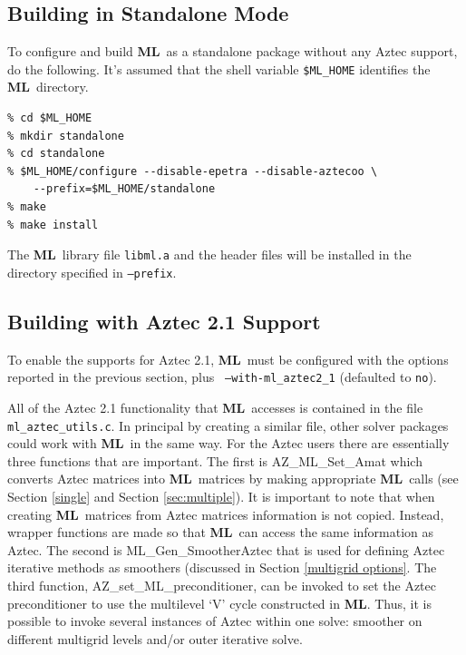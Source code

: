 \documentclass{article}[11pt]
\newcommand{\ML}     {{\bf ML}}
\begin{document}
\subsection{Building in Standalone Mode}
\label{Standalone Mode}
%

To configure and build \ML\ as a standalone package without any {\sc Aztec}
support, do the following.  It's assumed that the shell variable
\verb!$ML_HOME! identifies
the \ML\ directory.\\
\begin{verbatim}
% cd $ML_HOME
% mkdir standalone
% cd standalone
% $ML_HOME/configure --disable-epetra --disable-aztecoo \
    --prefix=$ML_HOME/standalone
% make
% make install
\end{verbatim}
The \ML\ library file {\tt libml.a} and the header files will be
installed in the directory specified in {\tt --prefix}.


\subsection{Building with {\sc Aztec 2.1} Support} 
\label{other packages}

To enable the supports for {\sc Aztec 2.1}, \ML\ must be configured with
the options reported in the previous section, plus {\tt
  --with-ml\_aztec2\_1} (defaulted to {\tt no}).

All of the {\sc Aztec 2.1} functionality that \ML\ accesses is contained
in the file \verb'ml_aztec_utils.c'. In principal by creating a similar
file, other solver packages could work with \ML\ in the same way.  For
the {\sc Aztec} users there are essentially three functions that are
important.  The first is {\sf AZ\_ML\_Set\_Amat} which converts {\sc
  Aztec} matrices into \ML\ matrices by making appropriate \ML\ calls (see
Section \ref{single} and Section \ref{sec:multiple}).  It is important
to note that when creating \ML\ matrices from {\sc Aztec} matrices
information is not copied. Instead, wrapper functions are made so that
\ML\ can access the same information as {\sc Aztec}.  The second is {\sf
  ML\_Gen\_SmootherAztec } that is used for defining {\sc Aztec}
iterative methods as smoothers (discussed in Section \ref{multigrid options}. The third function,
{\sf AZ\_set\_ML\_preconditioner}, can be invoked to set the {\sc Aztec}
preconditioner to use the multilevel `V' cycle constructed in \ML.
Thus, it is possible to invoke several instances of {\sc Aztec} within
one solve: smoother on different multigrid levels and/or outer iterative
solve.
\end{document}
